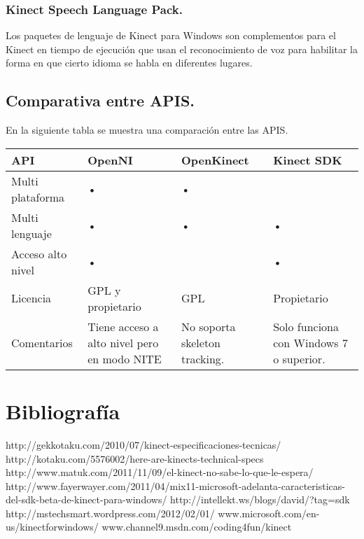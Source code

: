 \documentclass[11pt,a4paper]{article}
\begin{document}
\subsubsection{Kinect Speech Language Pack.}
Los paquetes de lenguaje de Kinect para Windows son complementos para el Kinect en tiempo de ejecución que usan el reconocimiento de voz para habilitar la forma en que cierto idioma se habla en diferentes lugares.

\subsection{Comparativa entre APIS.}
En la siguiente tabla se muestra una comparación entre las APIS.

\begin{tabular}{||p{2.5cm}||p{2.5cm}||p{2.5cm}||p{2.5cm}||}
\hline API & OpenNI & OpenKinect & Kinect SDK \\ 
\hline Multi plataforma & • & • &  \\ 
\hline Multi lenguaje & • & • & • \\ 
\hline Acceso alto nivel & • &  & • \\ 
\hline Licencia & GPL y propietario & GPL & Propietario \\ 
\hline Comentarios & Tiene acceso a alto nivel pero en modo NITE & No soporta skeleton tracking. & Solo funciona con Windows 7 o superior. \\ 
\hline 
\end{tabular} 

\section{Bibliografía}
http://gekkotaku.com/2010/07/kinect-especificaciones-tecnicas/
\newline
http://kotaku.com/5576002/here-are-kinects-technical-specs
\newline 
http://www.matuk.com/2011/11/09/el-kinect-no-sabe-lo-que-le-espera/
\newline
http://www.fayerwayer.com/2011/04/mix11-microsoft-adelanta-caracteristicas-del-sdk-beta-de-kinect-para-windows/
\newline
http://intellekt.ws/blogs/david/?tag=sdk
\newline
http://mstechsmart.wordpress.com/2012/02/01/
\newline
www.microsoft.com/en-us/kinectforwindows/
\newline
www.channel9.msdn.com/coding4fun/kinect
\end{document}
